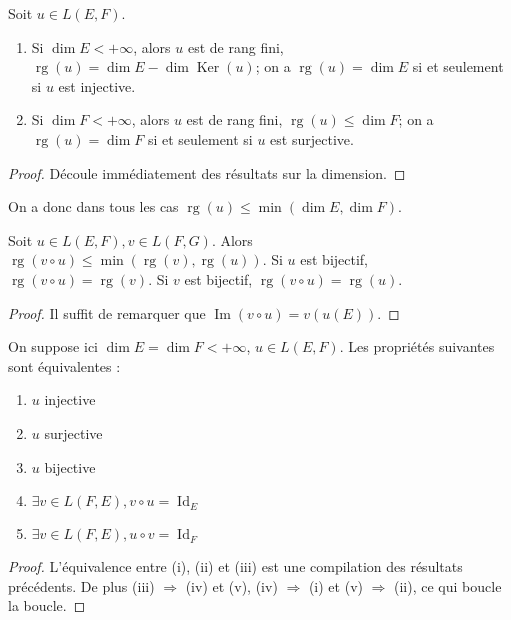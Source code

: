 \begin{thm}
Soit $u \in L(E,F)$. 
\begin{enumerate}
\item Si $\dim E < +\infty$, alors $u$ est de rang fini, $\operatorname{rg}(u) = \dim E - \dim \operatorname{Ker}(u)$; on a $\operatorname{rg}(u) = \dim E$ si et seulement si $u$ est injective.
\item Si $\dim F < +\infty$, alors $u$ est de rang fini, $\operatorname{rg}(u) \leq \dim F$; on a $\operatorname{rg}(u) = \dim F$ si et seulement si $u$ est surjective.
\end{enumerate}
\end{thm}

\begin{proof}
Découle immédiatement des résultats sur la dimension.
\end{proof}

\begin{rem}
On a donc dans tous les cas $\operatorname{rg}(u) \leq \min(\dim E, \dim F)$.
\end{rem}

\begin{prop}
Soit $u \in L(E,F), v \in L(F,G)$. Alors $\operatorname{rg}(v \circ u) \leq \min(\operatorname{rg}(v), \operatorname{rg}(u))$.
Si $u$ est bijectif, $\operatorname{rg}(v \circ u) = \operatorname{rg}(v)$. 
Si $v$ est bijectif, $\operatorname{rg}(v \circ u) = \operatorname{rg}(u)$.
\end{prop}

\begin{proof}
Il suffit de remarquer que $\operatorname{Im}(v \circ u) = v(u(E))$.
\end{proof}

\begin{thm}
On suppose ici $\dim E = \dim F < +\infty$, $u \in L(E,F)$. Les propriétés suivantes sont équivalentes :
\begin{enumerate}
\item $u$ injective
\item $u$ surjective
\item $u$ bijective
\item $\exists v \in L(F,E), v \circ u = \operatorname{Id}_E$
\item $\exists v \in L(F,E), u \circ v = \operatorname{Id}_F$
\end{enumerate}
\end{thm}

\begin{proof}
L'équivalence entre (i), (ii) et (iii) est une compilation des résultats précédents. De plus (iii) $\Rightarrow$ (iv) et (v), (iv) $\Rightarrow$ (i) et (v) $\Rightarrow$ (ii), ce qui boucle la boucle.
\end{proof}